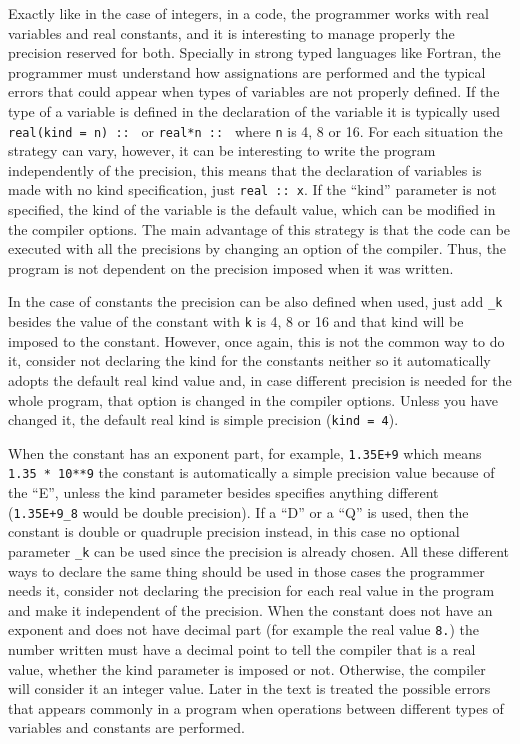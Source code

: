 Exactly like in the case of integers, in a code, the programmer works with real variables and real constants, and it is interesting to manage properly the precision reserved for both. Specially in strong typed languages like Fortran, the programmer must understand how assignations are performed and the typical errors that could appear when types of variables are not properly defined. If the type of a variable is defined in the declaration of the variable it is typically used \texttt{real(kind = n) :: } or \texttt{real*n :: } where \texttt{n} is 4, 8 or 16. For each situation the strategy can vary, however, it can be interesting to write the program independently of the precision, this means that the declaration of variables is made with no kind specification, just \texttt{real :: x}. If the ``kind'' parameter is not specified, the kind of the variable is the default value, which can be modified in the compiler options. The main advantage of this strategy is that the code can be executed with all the precisions by changing an option of the compiler. Thus, the program is not dependent on the precision imposed when it was written. 

In the case of constants the precision can be also defined when used, just add \texttt{\_k} besides the value of the constant with \texttt{k} is 4, 8 or 16 and that kind will be imposed to the constant. However, once again, this is not the common way to do it, consider not declaring the kind for the constants neither so it automatically adopts the default real kind value and, in case different precision is needed for the whole program, that option is changed in the compiler options. Unless you have changed it, the default real kind is simple precision (\texttt{kind = 4}). 

When the constant has an exponent part, for example, \texttt{1.35E+9} which means \texttt{1.35 * 10**9} the constant is automatically a simple precision value because of the ``E'', unless the kind parameter besides specifies anything different (\texttt{1.35E+9\_8} would be double precision). If a ``D'' or a ``Q'' is used, then the constant is double or quadruple precision instead, in this case no optional parameter \texttt{\_k} can be used since the precision is already chosen. All these different ways to declare the same thing should be used in those cases the programmer needs it, consider not declaring the precision for each real value in the program and make it independent of the precision. When the constant does not have an exponent and does not have decimal part (for example the real value \texttt{8.}) the number written must have a decimal point to tell the compiler that is a real value, whether the kind parameter is imposed or not. Otherwise, the compiler will consider it an integer value. Later in the text is treated the possible errors that appears commonly in a program when operations between different types of variables and constants are performed.

